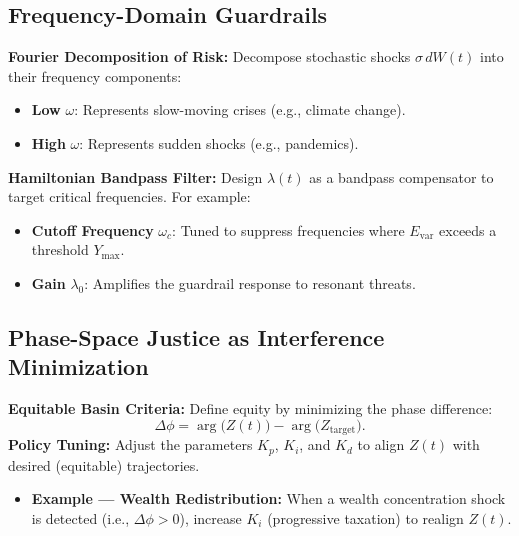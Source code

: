 \documentclass{article}
\theoremstyle{definition}
\begin{document}
\subsection{Frequency-Domain Guardrails}
\textbf{Fourier Decomposition of Risk:} Decompose stochastic shocks $\sigma\, dW(t)$ into their frequency components:
\begin{itemize}
    \item \textbf{Low} $\omega$: Represents slow-moving crises (e.g., climate change).
    \item \textbf{High} $\omega$: Represents sudden shocks (e.g., pandemics).
\end{itemize}
\textbf{Hamiltonian Bandpass Filter:} Design $\lambda(t)$ as a bandpass compensator to target critical frequencies. For example:
\begin{itemize}
    \item \textbf{Cutoff Frequency} $\omega_c$: Tuned to suppress frequencies where $E_{\text{var}}$ exceeds a threshold $Y_{\text{max}}$.
    \item \textbf{Gain} $\lambda_0$: Amplifies the guardrail response to resonant threats.
\end{itemize}

\subsection{Phase-Space Justice as Interference Minimization}
\textbf{Equitable Basin Criteria:} Define equity by minimizing the phase difference:
\[
\Delta \phi = \arg\bigl(Z(t)\bigr) - \arg\bigl(Z_{\text{target}}\bigr).
\]
\textbf{Policy Tuning:} Adjust the parameters $K_p$, $K_i$, and $K_d$ to align $Z(t)$ with desired (equitable) trajectories.
\begin{itemize}
    \item \textbf{Example --- Wealth Redistribution:} When a wealth concentration shock is detected (i.e., $\Delta \phi > 0$), increase $K_i$ (progressive taxation) to realign $Z(t)$.
\end{itemize}
\end{document}
